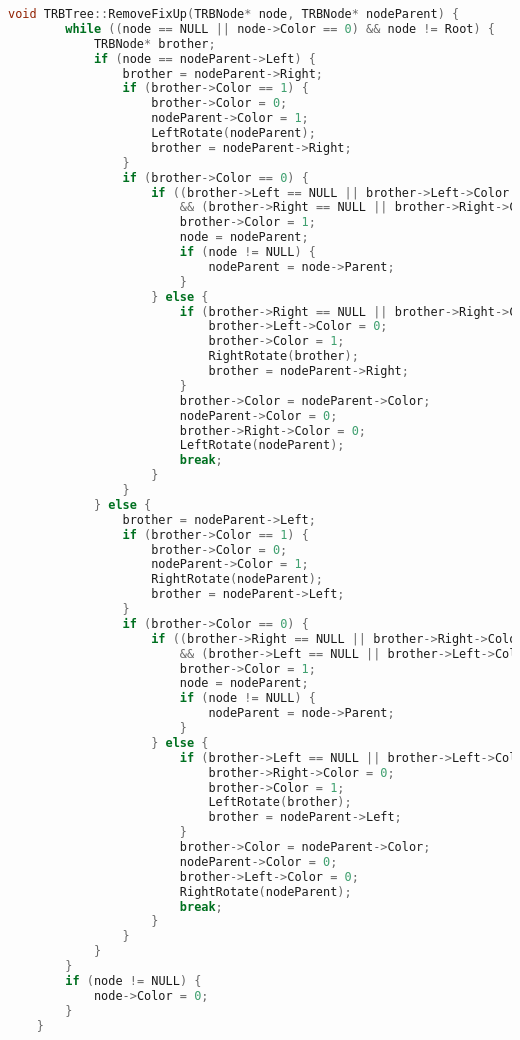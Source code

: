 \begin{lstlisting}[language=C++]
    void TRBTree::RemoveFixUp(TRBNode* node, TRBNode* nodeParent) {
        while ((node == NULL || node->Color == 0) && node != Root) {
            TRBNode* brother;
            if (node == nodeParent->Left) {
                brother = nodeParent->Right;
                if (brother->Color == 1) {
                    brother->Color = 0;
                    nodeParent->Color = 1;
                    LeftRotate(nodeParent);
                    brother = nodeParent->Right;
                }
                if (brother->Color == 0) {
                    if ((brother->Left == NULL || brother->Left->Color == 0)
                        && (brother->Right == NULL || brother->Right->Color == 0)) {
                        brother->Color = 1;
                        node = nodeParent;
                        if (node != NULL) {
                            nodeParent = node->Parent;
                        }
                    } else {
                        if (brother->Right == NULL || brother->Right->Color == 0) {
                            brother->Left->Color = 0;
                            brother->Color = 1;
                            RightRotate(brother);
                            brother = nodeParent->Right;
                        }
                        brother->Color = nodeParent->Color;
                        nodeParent->Color = 0;
                        brother->Right->Color = 0;
                        LeftRotate(nodeParent);
                        break;
                    }
                }
            } else {
                brother = nodeParent->Left;
                if (brother->Color == 1) {
                    brother->Color = 0;
                    nodeParent->Color = 1;
                    RightRotate(nodeParent);
                    brother = nodeParent->Left;
                }
                if (brother->Color == 0) {
                    if ((brother->Right == NULL || brother->Right->Color == 0)
                        && (brother->Left == NULL || brother->Left->Color == 0)) {
                        brother->Color = 1;
                        node = nodeParent;
                        if (node != NULL) {
                            nodeParent = node->Parent;
                        }
                    } else {
                        if (brother->Left == NULL || brother->Left->Color == 0) {
                            brother->Right->Color = 0;
                            brother->Color = 1;
                            LeftRotate(brother);
                            brother = nodeParent->Left;
                        }
                        brother->Color = nodeParent->Color;
                        nodeParent->Color = 0;
                        brother->Left->Color = 0;
                        RightRotate(nodeParent);
                        break;
                    }
                }
            }
        }
        if (node != NULL) {
            node->Color = 0;
        }
    }
    

\end{lstlisting}
